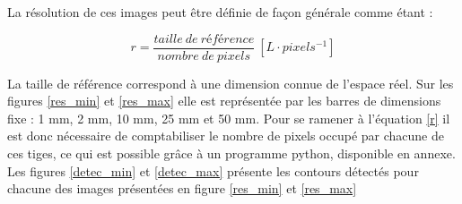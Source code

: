 \documentclass[11pt,letterpaper]{article}
\begin{document}
La résolution de ces images peut être définie de façon générale comme étant : 

\begin{equation}
    r = \frac{taille \: de \: r\textit{é}f\textit{é}rence}{nombre \: de \: pixels} \: [L\cdot pixels^{-1}]
    \label{r}
\end{equation}

La taille de référence correspond à une dimension connue de l'espace réel. Sur les figures \ref{res_min} et \ref{res_max} elle est représentée par les barres de dimensions fixe : 1 mm, 2 mm, 10 mm, 25 mm et 50 mm. Pour se ramener à l'équation \ref{r} il est donc nécessaire de comptabiliser le nombre de pixels occupé par chacune de ces tiges, ce qui est possible grâce à un programme python, disponible en annexe. Les figures \ref{detec_min} et \ref{detec_max} présente les contours détectés pour chacune des images présentées en figure \ref{res_min} et \ref{res_max}
\end{document}
